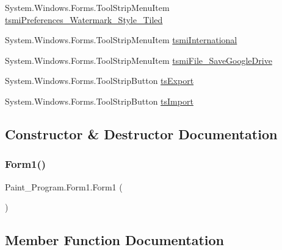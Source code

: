 \begin{DoxyCompactItemize}
System.\+Windows.\+Forms.\+Tool\+Strip\+Menu\+Item \mbox{\hyperlink{class_paint___program_1_1_form1_a34b8fb763b018948910a3a57cdef5008}{tsmi\+Preferences\+\_\+\+Watermark\+\_\+\+Style\+\_\+\+Tiled}}
\item 
System.\+Windows.\+Forms.\+Tool\+Strip\+Menu\+Item \mbox{\hyperlink{class_paint___program_1_1_form1_a3ef1157808559cef1fe8f20c37a0ea67}{tsmi\+International}}
\item 
System.\+Windows.\+Forms.\+Tool\+Strip\+Menu\+Item \mbox{\hyperlink{class_paint___program_1_1_form1_a2f5cdb425d393468ba85249be3396b4b}{tsmi\+File\+\_\+\+Save\+Google\+Drive}}
\item 
System.\+Windows.\+Forms.\+Tool\+Strip\+Button \mbox{\hyperlink{class_paint___program_1_1_form1_a1798dbbfeb9fe2269f5df600fac8a131}{ts\+Export}}
\item 
System.\+Windows.\+Forms.\+Tool\+Strip\+Button \mbox{\hyperlink{class_paint___program_1_1_form1_afa314201f3d656409b0ee3d71b72d87b}{ts\+Import}}
\end{DoxyCompactItemize}


\subsection{Constructor \& Destructor Documentation}
\mbox{\label{class_paint___program_1_1_form1_aefb0d3ee7baac9f44e9d742615ec526d}} 
\subsubsection{\texorpdfstring{Form1()}{Form1()}}
{\footnotesize\ttfamily Paint\+\_\+\+Program.\+Form1.\+Form1 (\begin{DoxyParamCaption}{ }\end{DoxyParamCaption})\hspace{0.3cm}{\ttfamily [inline]}}



\subsection{Member Function Documentation}
\mbox{\label{class_paint___program_1_1_form1_a39a6d9fbd5f250daa6fdbdc3d427c743}} 

